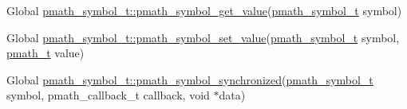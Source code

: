 \label{deprecated__deprecated000001}
\hypertarget{deprecated__deprecated000001}{}
 \begin{description}
\item[Global \hyperlink{group__symbols_gbf330376870422d219ae9f0557e515c2}{pmath\_\-symbol\_\-t::pmath\_\-symbol\_\-get\_\-value}(\hyperlink{classpmath__symbol__t}{pmath\_\-symbol\_\-t} symbol) ]\end{description}


\label{deprecated__deprecated000002}
\hypertarget{deprecated__deprecated000002}{}
 \begin{description}
\item[Global \hyperlink{group__symbols_g8344005c16b86be82d2efdedb0795a0c}{pmath\_\-symbol\_\-t::pmath\_\-symbol\_\-set\_\-value}(\hyperlink{classpmath__symbol__t}{pmath\_\-symbol\_\-t} symbol, \hyperlink{classpmath__t}{pmath\_\-t} value) ]\end{description}


\label{deprecated__deprecated000003}
\hypertarget{deprecated__deprecated000003}{}
 \begin{description}
\item[Global \hyperlink{group__symbols_g95b141d9cb33fba80d6a807f304ee3b7}{pmath\_\-symbol\_\-t::pmath\_\-symbol\_\-synchronized}(\hyperlink{classpmath__symbol__t}{pmath\_\-symbol\_\-t} symbol, pmath\_\-callback\_\-t callback, void $\ast$data) ]\end{description}
